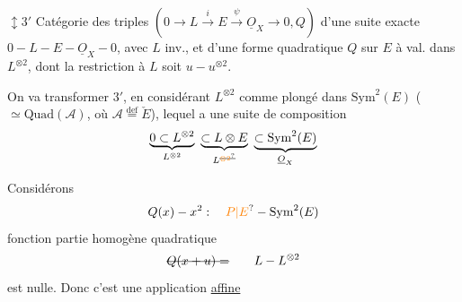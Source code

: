 $\updownarrow$\quad\textcircled{$3'$} Catégorie des triples $(0\to L\overset{i}\to E\overset{\psi}\to\underline O_X\to0,Q)$ d'une suite exacte $0\mathbin{-}L\mathbin{-}E\mathbin{-}\underline O_X\mathbin{-}0$, avec $L$ inv., et d'une forme quadratique $Q$ sur $E$ à val. dans $L^{\otimes2}$, dont la restriction à $L$ soit $u\mathbin{-}u^{\otimes2}$.

On va transformer \textcircled{$3'$}, en  considérant $L^{\otimes2}$ comme plongé dans $\mathrm{Sym}^2(E)$ ($\simeq\mathrm{Quad}(\mathcal A)$, où $\mathcal A\overset{\mathrm{def}}=\check E$), lequel a une suite de composition
\[
\underbrace{0\subset L^{\otimes2}}_{L^{\otimes2}}\ \underbrace{\subset L\otimes E}_{L^{\deleted{\unsure{\otimes2}}}}\ \underbrace{\subset\mathrm{Sym}^2(E)}_{\underline O_X}
\]

Considérons 
\[
Q(x)-x^2:\quad\unsure{P|E}\mathbin{-}\mathrm{Sym}^2(E)
\]
fonction   partie homogène  quadratique
\[
\deleted{Q(x+u)=}\qquad L\mathbin{-}L^{\otimes2}
\]
est nulle. Donc c'est une application \uline{affine}


